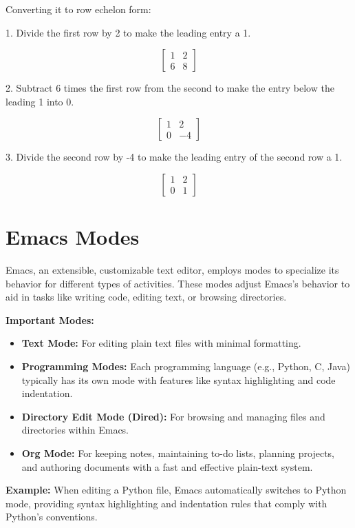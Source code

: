 \documentclass{article}
\begin{document}
Converting it to row echelon form:

1. Divide the first row by 2 to make the leading entry a 1.

\[ \begin{bmatrix} 1 & 2 \\ 6 & 8 \end{bmatrix} \]

2. Subtract 6 times the first row from the second to make the entry below the leading 1 into 0.

\[ \begin{bmatrix} 1 & 2 \\ 0 & -4 \end{bmatrix} \]

3. Divide the second row by -4 to make the leading entry of the second row a 1.

\[ \begin{bmatrix} 1 & 2 \\ 0 & 1 \end{bmatrix} \]

\section{Emacs Modes}

Emacs, an extensible, customizable text editor, employs modes to specialize its behavior for different types of activities. These modes adjust Emacs's behavior to aid in tasks like writing code, editing text, or browsing directories.

\textbf{Important Modes:}

\begin{itemize}
    \item \textbf{Text Mode:} For editing plain text files with minimal formatting.
    \item \textbf{Programming Modes:} Each programming language (e.g., Python, C, Java) typically has its own mode with features like syntax highlighting and code indentation.
    \item \textbf{Directory Edit Mode (Dired):} For browsing and managing files and directories within Emacs.
    \item \textbf{Org Mode:} For keeping notes, maintaining to-do lists, planning projects, and authoring documents with a fast and effective plain-text system.
\end{itemize}

\textbf{Example:} When editing a Python file, Emacs automatically switches to Python mode, providing syntax highlighting and indentation rules that comply with Python's conventions.
\end{document}
